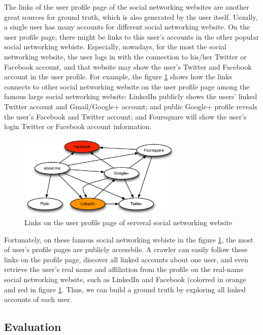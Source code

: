 \documentclass[11pt,letterpaper]{article}
\begin{document}
The links of the user profile page of the social networking websites are another great sources for ground truth, which is also generated by the user itself. Usually, a single user has many accounts for different social networking website. On the user profile page, there might be links to this user's accounts in the other popular social networking webiste. Especially, nowadays, for the most the social networking website, the user logs in with the connection to his/her Twitter or Facebook account, and that website may show the user's Twitter and Facebook account in the user profile. For example, the figure \ref{fig:infer} shows how the links connects to other social networking website on the user profile page among the famous large social networking website: LinkedIn publicly shows the users' linked Twitter account and Gmail/Google+ account; and public Google+ profile reveals the user's Facebook and Twitter account; and Foursquare will show the user's login Twitter or Facebook account information. 

\begin{figure}[h!]
\centering
\caption{Links on the user profile page of serveral social networking website}
\label{fig:infer}
\includegraphics[width=0.7\textwidth]{fig/infer.eps}
\end{figure}


Fortunately, on these famous social networking webiste in the figure \ref{fig:infer}, the most of user's profile pages are publicly accessbile. A crawler can easily follow these links on the profile page, discover all linked accounts about one user, and even retrieve the user's real name and affiliation from the profile on the real-name social networking website, such as LinkedIn and Facebook (colorred in orange and red in figure \ref{fig:infer}. Thus, we can build a ground truth by exploring all linked accounts of each user. 

\subsection{Evaluation}
\end{document}

